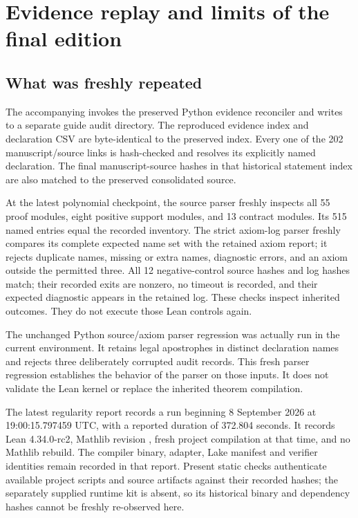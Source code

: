 \section{Evidence replay and limits of the final edition}\label{sec:replay}
\subsection{What was freshly repeated}
The accompanying  invokes the preserved Python evidence reconciler and writes to a separate guide audit directory. The reproduced evidence index and declaration CSV are byte-identical to the preserved index. Every one of the 202 manuscript/source links is hash-checked and resolves its explicitly named declaration. The final manuscript-source hashes in that historical statement index are also matched to the preserved consolidated source.

At the latest polynomial checkpoint, the source parser freshly inspects all 55 proof modules, eight positive support modules, and 13 contract modules. Its 515 named entries equal the recorded inventory. The strict axiom-log parser freshly compares its complete expected name set with the retained axiom report; it rejects duplicate names, missing or extra names, diagnostic errors, and an axiom outside the permitted three. All 12 negative-control source hashes and log hashes match; their recorded exits are nonzero, no timeout is recorded, and their expected diagnostic appears in the retained log. These checks inspect inherited outcomes. They do not execute those Lean controls again.

The unchanged Python source/axiom parser regression was actually run in the current environment. It retains legal apostrophes in distinct declaration names and rejects three deliberately corrupted audit records. This fresh parser regression establishes the behavior of the parser on those inputs. It does not validate the Lean kernel or replace the inherited theorem compilation.

The latest regularity report records a run beginning 8 September 2026 at 19:00:15.797459 UTC, with a reported duration of 372.804 seconds. It records Lean 4.34.0-rc2, Mathlib revision , fresh project compilation at that time, and no Mathlib rebuild. The compiler binary, adapter, Lake manifest and verifier identities remain recorded in that report. Present static checks authenticate available project scripts and source artifacts against their recorded hashes; the separately supplied runtime kit is absent, so its historical binary and dependency hashes cannot be freshly re-observed here.


